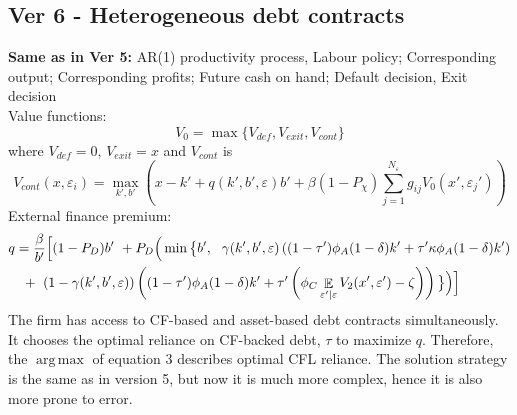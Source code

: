 \documentclass[12pt]{article}
\DeclareMathOperator{\E}{\mathbb{E}}
\DeclareMathOperator*{\argmax}{arg\,max}
\begin{document}
\subsection*{Ver 6 - Heterogeneous debt contracts}
\textbf{Same as in Ver 5:} AR(1) productivity process, Labour policy; Corresponding output; Corresponding profits; Future cash on hand; Default decision, Exit decision \vspace{3mm}  \\
Value functions:
\begin{equation}
    V_0 = \max \{ V_{def}, V_{exit}, V_{cont} \}
\end{equation}
where $ V_{def} = 0$, $V_{exit} = x$ and $V_{cont}$ is
\begin{equation}
     V_{cont}(x, \varepsilon_i) = \max_{k',b'}  \left( x - k' +  q(k',b',\varepsilon) b' +
            \beta (1-P_\chi) \sum_{j=1}^{N_\varepsilon} g_{ij}  V_0(x',\varepsilon_j') \right)
\end{equation}
External finance premium: 
\begin{equation} \label{eq:opt_tau}
    \begin{split}
        & q = \frac{\beta}{b'} \Big{[} (1-P_D)b' \ +  P_D \Big(\min \big\{ b', \ \  \gamma(k',b',\varepsilon) \left( (1-\tau') \phi_A (1-\delta) k' +\tau' \kappa \phi_A  (1-\delta) k' \right)  \\
        & \quad  +  \ (1-\gamma(k',b',\varepsilon))\left((1-\tau') \phi_A (1-\delta) k' +\tau' \left( \phi_C \E_{\varepsilon'|\varepsilon}V_2 (x', \varepsilon') - \zeta \right) \right) \big\} \Big) \Big{]} 
    \end{split}
\end{equation}
The firm has access to CF-based and asset-based debt contracts simultaneously. It chooses the optimal reliance on CF-backed debt, $\tau$ to maximize $q$. Therefore, the $\argmax$ of equation 3 describes optimal CFL reliance. The solution strategy is the same as in version 5, but now it is much more complex, hence it is also more prone to error.
\end{document}
